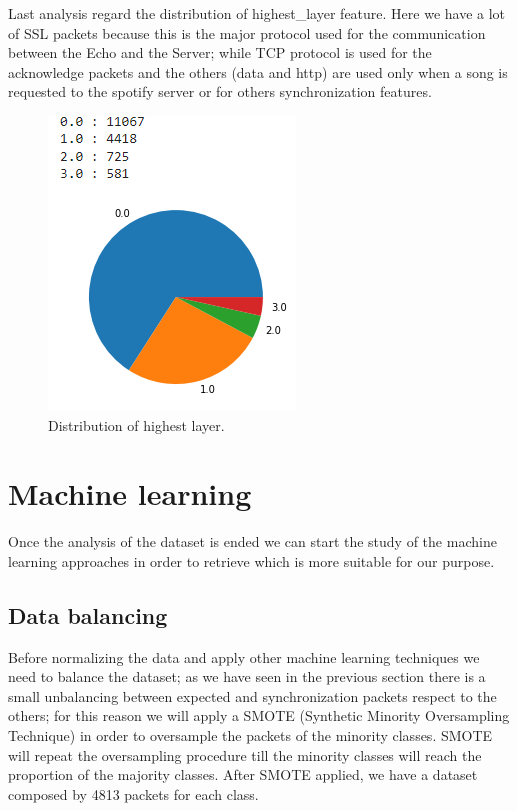 \documentclass[sigconf]{acmart}
\begin{document}
    Last analysis regard the distribution of highest\_layer feature. Here we have a lot of SSL packets because this is the major protocol used for the communication between the Echo and the Server; while TCP protocol is used for the acknowledge packets and the others (data and http) are used only when a song is requested to the spotify server or for others synchronization features.
    \begin{figure}[h!]
        \includegraphics[width=0.6\linewidth]{img/highest_layer.png}
        \caption{Distribution of highest layer.}
        \label{fig:highest_layer}
    \end{figure}


    \section{Machine learning}
    Once the analysis of the dataset is ended we can start the study of the machine learning approaches in order to retrieve which is more suitable for our purpose.

    \subsection{Data balancing}
    Before normalizing the data and apply other machine learning techniques we need to balance the dataset; as we have seen in the previous section there is a small unbalancing between expected and synchronization packets respect to the others; for this reason we will apply a SMOTE (Synthetic Minority Oversampling Technique) in order to oversample the packets of the minority classes. SMOTE will repeat the oversampling procedure till the minority classes will reach the proportion of the majority classes. After SMOTE applied, we have a dataset composed by 4813 packets for each class.
\end{document}
